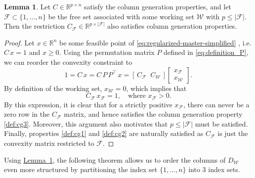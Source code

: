\documentclass{book}
\theoremstyle{definition}
\newtheorem{lemma}[theorem]{Lemma}
\newcommand{\lemref}[1]{\hyperref[#1]{Lemma~\ref*{#1}}}
\numberwithin{algorithm_}{chapter}
\begin{document}
\begin{lemma} \label{lem:column-generation-properties-freevars}
Let $C \in \mathbb{R}^{p \times n}$ satisfy the column generation properties, and let $\mathcal{F} \subset \{1, \dots, n\}$ be the free set associated with some working set $\mathcal{W}$ with $p \leq |\mathcal{F}|$.  
Then the restriction $C_\mathcal{F} \in \mathbb{R}^{p \times |\mathcal{F}|}$ also satisfies column generation properties.

\begin{proof}
Let $x \in \mathbb{R}^n$ be some feasible point of \eqref{eq:regularized-master-simplified} , i.e. $C \, x = 1$ and $x \geq 0$. Using the permutation matrix $P$ defined in \eqref{eq:definition_P}, we can reorder the convexity constraint to
\[
	1 = C \, x = C \, P \, P^\top \, x = [\, C_\mathcal{F} \;\; C_\mathcal{W} \,] 
\begin{bmatrix} x_\mathcal{F} \\ x_\mathcal{W} \end{bmatrix}.
\]
By definition of the working set, $x_\mathcal{W} = 0$, which implies that
\[
	C_\mathcal{F} \, x_\mathcal{F} = 1, \quad \text{where } x_\mathcal{F} > 0.
\]
By this expression, it is clear that for a strictly positive $x_\mathcal{F}$, there can never be a zero row in the $C_\mathcal{F}$ matrix, and hence satisfies the column generation property \ref{def:cg3}. Moreover, this argument also motivates that $p \leq |\mathcal{F}|$ must be satisfied. Finally, properties \ref{def:cg1} and \ref{def:cg2} are naturally satisfied as $C_\mathcal{F}$ is just the convexity matrix restricted to $\mathcal{F}$.

\end{proof}
\end{lemma}

\medskip

Using \lemref{lem:column-generation-properties-freevars}, the following theorem allows us to order the columns of $D_{\mathcal{W}}$ even more structured by partitioning the index set $\{1, \ldots, n\}$ into 3 index sets.
\end{document}
